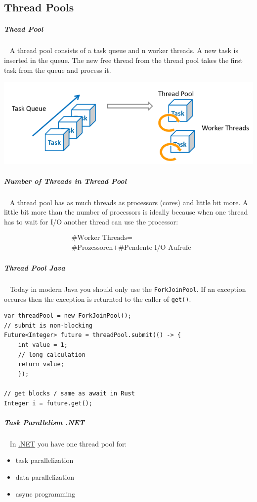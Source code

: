 \documentclass[11pt,twoside,landscape]{article}
\begin{document}
\begin{multicols}{3}
\section{Thread Pools}
\label{sec:org0c61bd9}
\subparagraph{Thead Pool} \
\label{sec:org6832954}
A thread pool consists of a task queue and n worker threads.
A new task is inserted in the queue.
The new free thread from the thread pool takes the first task from the queue and process it.

{
\begin{center}
\includegraphics[width=.9\linewidth]{img/thread_pool.png}
\end{center}
\label{fig:thread-pool}
}

\subparagraph{Number of Threads in Thread Pool} \
\label{sec:org7320a67}
A thread pool has as much threads as processors (cores) and little bit more.
A little bit more than the number of processors is ideally because when one thread has to wait for I/O another thread can use the processor:

\begin{equation}
  \begin{align}
    & \text{\#Worker Threads} = \\
    & \text{\#Prozessoren} + \text{\#Pendente I/O-Aufrufe}
  \end{align}
\end{equation}

\subparagraph{Thread Pool Java} \
\label{sec:org910a80d}
Today in modern Java you should only use the \texttt{ForkJoinPool}.
If an exception occures then the exception is returnted to the caller of \texttt{get()}.

\lstset{language=java,label= ,caption= ,captionpos=b,numbers=none}
\begin{lstlisting}
var threadPool = new ForkJoinPool();
// submit is non-blocking
Future<Integer> future = threadPool.submit(() -> {
	int value = 1;
	// long calculation
	return value;
    });

// get blocks / same as await in Rust
Integer i = future.get();
\end{lstlisting}
\subparagraph{Task Parallelism .NET} \
\label{sec:org72142ba}
In \href{../../../roam/20211003114703-net.org}{.NET} you have one thread pool for:
\begin{itemize}
\item task parallelization
\item data parallelization
\item async programming
\end{itemize}


\end{multicols}
\end{document}
